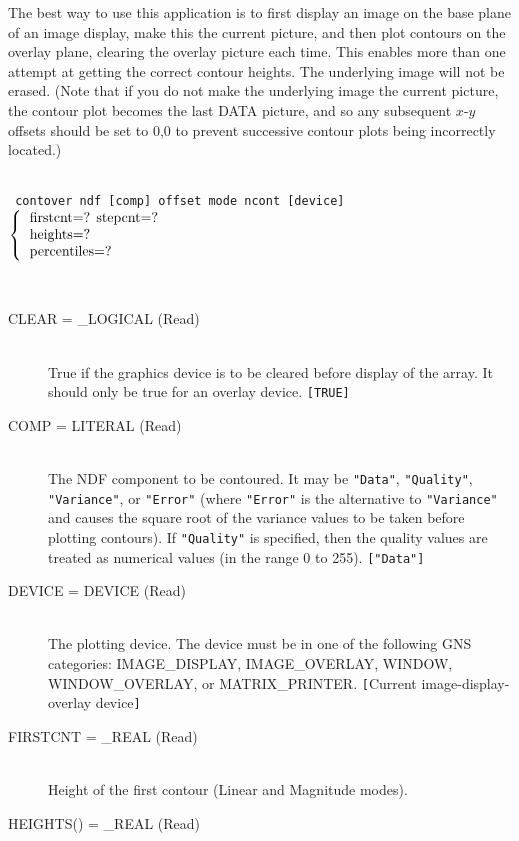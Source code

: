\documentclass[twoside,11pt]{article}
\newcommand{\htmlref}[2]{#1}
\newcommand{\sstusage}[1]{\pagebreak[3] \item[Usage:] \mbox{} \\[1.3ex] {\ssttt #1}}
\newcommand{\sstparameters}[1]{
   \goodbreak
   \item[Parameters:] \mbox{} \\
   \vspace{-3.5ex}
   \begin{description}
      #1
   \end{description}
}
\newcommand{\sstsubsection}[1]{ \item[{#1}] \mbox{} \\}
\newcommand{\ssttt}{\tt}
\newcommand{\sstusage}[1]{%
      \item[\htmlref{Usage:}{ap:usage}] \mbox{}
      {\ssttt #1}\smallskip%
   }
\newcommand{\sstparameters}[1]{
      \item[\htmlref{Parameters:}{se:param}]
      \begin{description}
         #1
      \end{description}
   }
\newcommand{\sstsubsection}[1]{\item[{#1}]}
\begin{document}
{{      The best way to use this application is to first display an image
      on the base plane of an image display, make this the current
      picture, and then plot contours on the overlay plane, clearing
      the overlay picture each time. This enables more than one attempt
      at getting the correct contour heights.  The underlying image will
      not be erased. (Note that if you do not make the underlying image
      the current picture, the contour plot becomes the last DATA
      picture, and so any subsequent $x$-$y$ offsets should be set to 0,0 to
      prevent successive contour plots being incorrectly located.)
   }
   \sstusage{
      contover ndf [comp] offset mode ncont [device]
        \newline\hspace*{1.5em}
        $\left\{ {\begin{tabular}{l}
                    firstcnt=? stepcnt=? \\
                    heights=? \\
                    percentiles=?
                   \end{tabular} }
        \right.$
        \newline\hspace*{1.9em}
        \makebox[0mm][c]{\small mode}
   }
   \sstparameters{
      \sstsubsection{
         CLEAR = \_LOGICAL (Read)
      }{
         True if the graphics device is to be cleared before display
         of the array. It should only be true for an overlay device.
         {\tt [TRUE]}
      }
      \sstsubsection{
         COMP = LITERAL (Read)
      }{
         The NDF component to be contoured.  It may be {\tt "Data"},
         {\tt "Quality"}, {\tt "Variance"}, or {\tt "Error"} (where
         {\tt "Error"} is the alternative to {\tt "Variance"} and causes
         the square root of the variance values to be taken before
         plotting contours).  If {\tt "Quality"} is specified, then
         the quality values are treated as numerical values (in the
         range 0 to 255).  {\tt ["Data"]}
      }
      \sstsubsection{
         DEVICE = DEVICE (Read)
      }{
         The plotting device. The device must be in one of the following
         GNS categories: IMAGE\_DISPLAY, IMAGE\_OVERLAY, WINDOW,
         WINDOW\_OVERLAY, or MATRIX\_PRINTER.
         {\tt [}Current image-display-overlay device{\tt ]}
      }
      \sstsubsection{
         FIRSTCNT = \_REAL (Read)
      }{
         Height of the first contour (Linear and Magnitude modes).
      }
      \sstsubsection{
         HEIGHTS() = \_REAL (Read)
}}}
\end{document}
